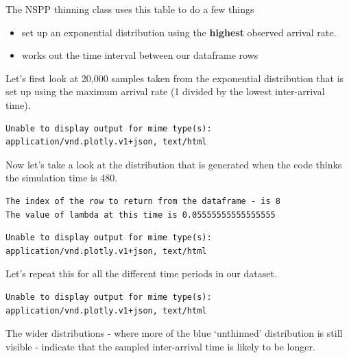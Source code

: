 \documentclass[
  letterpaper,
  DIV=11,
  numbers=noendperiod]{scrreprt}
\providecommand{\tightlist}{%
  \setlength{\itemsep}{0pt}\setlength{\parskip}{0pt}}\usepackage{longtable,booktabs,array}
\begin{document}
\begin{tcolorbox}[enhanced jigsaw, rightrule=.15mm, colback=white, colframe=quarto-callout-note-color-frame, colbacktitle=quarto-callout-note-color!10!white, toprule=.15mm, coltitle=black, opacityback=0, titlerule=0mm, bottomtitle=1mm, breakable, title=\textcolor{quarto-callout-note-color}{\faInfo}\hspace{0.5em}{Click here for a more in-depth breakdown about how the NSPPThinning
class works under the hood}, opacitybacktitle=0.6, toptitle=1mm, arc=.35mm, bottomrule=.15mm, leftrule=.75mm, left=2mm]

The NSPP thinning class uses this table to do a few things

\begin{itemize}
\tightlist
\item
  set up an exponential distribution using the \textbf{highest} observed
  arrival rate.
\item
  works out the time interval between our dataframe rows
\end{itemize}

Let's first look at 20,000 samples taken from the exponential
distribution that is set up using the maximum arrival rate (1 divided by
the lowest inter-arrival time).

\begin{verbatim}
Unable to display output for mime type(s): application/vnd.plotly.v1+json, text/html
\end{verbatim}

Now let's take a look at the distribution that is generated when the
code thinks the simulation time is 480.

\begin{verbatim}
The index of the row to return from the dataframe - is 8
The value of lambda at this time is 0.05555555555555555
\end{verbatim}

\begin{verbatim}
Unable to display output for mime type(s): application/vnd.plotly.v1+json, text/html
\end{verbatim}

Let's repeat this for all the different time periods in our dataset.

\begin{verbatim}
Unable to display output for mime type(s): application/vnd.plotly.v1+json, text/html
\end{verbatim}

The wider distributions - where more of the blue `unthinned'
distribution is still visible - indicate that the sampled inter-arrival
time is likely to be longer.

\end{tcolorbox}
\end{document}
